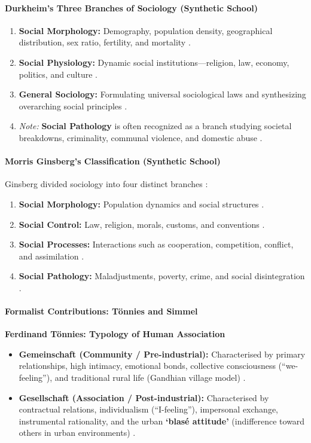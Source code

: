 \paragraph{Durkheim's Three Branches of Sociology (Synthetic School)}
\begin{enumerate}
    \item \textbf{Social Morphology:} Demography, population density, geographical distribution, sex ratio, fertility, and mortality .
    \item \textbf{Social Physiology:} Dynamic social institutions---religion, law, economy, politics, and culture .
    \item \textbf{General Sociology:} Formulating universal sociological laws and synthesizing overarching social principles .
    \item \textit{Note:} \textbf{Social Pathology} is often recognized as a branch studying societal breakdowns, criminality, communal violence, and domestic abuse .
\end{enumerate}

\paragraph{Morris Ginsberg's Classification (Synthetic School)}
Ginsberg divided sociology into four distinct branches :
\begin{enumerate}
    \item \textbf{Social Morphology:} Population dynamics and social structures .
    \item \textbf{Social Control:} Law, religion, morals, customs, and conventions .
    \item \textbf{Social Processes:} Interactions such as cooperation, competition, conflict, and assimilation .
    \item \textbf{Social Pathology:} Maladjustments, poverty, crime, and social disintegration .
\end{enumerate}

\paragraph{Formalist Contributions: Tönnies and Simmel}
\begin{ComparisonBox}
\textbf{Ferdinand Tönnies: Typology of Human Association}
\begin{itemize}
    \item \textbf{Gemeinschaft (Community / Pre-industrial):} Characterised by primary relationships, high intimacy, emotional bonds, collective consciousness (``we-feeling''), and traditional rural life (Gandhian village model) .
    \item \textbf{Gesellschaft (Association / Post-industrial):} Characterised by contractual relations, individualism (``I-feeling''), impersonal exchange, instrumental rationality, and the urban \textbf{`blasé attitude'} (indifference toward others in urban environments) .
\end{itemize}
\end{ComparisonBox}

